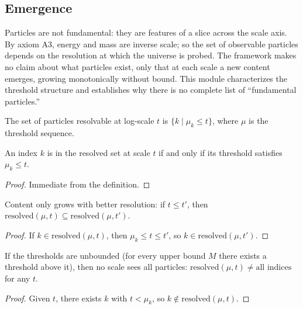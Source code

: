\subsection{Emergence}

Particles are not fundamental: they are features of a slice across the scale axis. By axiom A3, energy and mass are inverse scale; so the set of observable particles depends on the resolution at which the universe is probed. The framework makes no claim about what particles exist, only that at each scale a new content emerges, growing monotonically without bound. This module characterizes the threshold structure and establishes why there is no complete list of ``fundamental particles.''

\begin{definition}
The set of particles resolvable at log-scale $t$ is $\{k \mid \mu_k \leq t\}$, where $\mu$ is the threshold sequence.
\end{definition}

\begin{theorem}
An index $k$ is in the resolved set at scale $t$ if and only if its threshold satisfies $\mu_k \leq t$.
\end{theorem}

\begin{proof}
Immediate from the definition.
\end{proof}

\begin{theorem}
Content only grows with better resolution: if $t \leq t'$, then $\mathrm{resolved}(\mu, t) \subseteq \mathrm{resolved}(\mu, t')$.
\end{theorem}

\begin{proof}
If $k \in \mathrm{resolved}(\mu, t)$, then $\mu_k \leq t \leq t'$, so $k \in \mathrm{resolved}(\mu, t')$.
\end{proof}

\begin{theorem}
If the thresholds are unbounded (for every upper bound $M$ there exists a threshold above it), then no scale sees all particles: $\mathrm{resolved}(\mu, t) \neq \text{all indices}$ for any $t$.
\end{theorem}

\begin{proof}
Given $t$, there exists $k$ with $t < \mu_k$, so $k \notin \mathrm{resolved}(\mu, t)$.
\end{proof}

